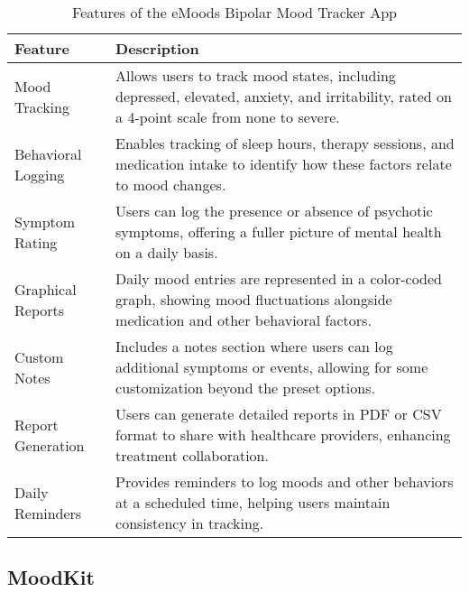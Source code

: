 \FloatBarrier
\begin{table}[ht]
\centering
\begin{tabular}{|p{4cm}|p{10cm}|}
\hline
\textbf{Feature} & \textbf{Description} \\ \hline
Mood Tracking & Allows users to track mood states, including depressed, elevated, anxiety, and irritability, rated on a 4-point scale from none to severe. \\ \hline
Behavioral Logging & Enables tracking of sleep hours, therapy sessions, and medication intake to identify how these factors relate to mood changes. \\ \hline
Symptom Rating & Users can log the presence or absence of psychotic symptoms, offering a fuller picture of mental health on a daily basis. \\ \hline
Graphical Reports & Daily mood entries are represented in a color-coded graph, showing mood fluctuations alongside medication and other behavioral factors. \\ \hline
Custom Notes & Includes a notes section where users can log additional symptoms or events, allowing for some customization beyond the preset options. \\ \hline
Report Generation & Users can generate detailed reports in PDF or CSV format to share with healthcare providers, enhancing treatment collaboration. \\ \hline
Daily Reminders & Provides reminders to log moods and other behaviors at a scheduled time, helping users maintain consistency in tracking. \\ \hline
\end{tabular}
\caption{Features of the eMoods Bipolar Mood Tracker App}
\label{tab:emoods_features}
\end{table}
\FloatBarrier

\subsection{MoodKit}

